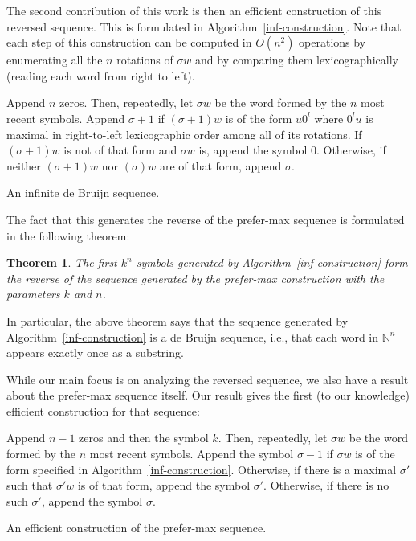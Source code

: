 \documentclass{article}
\newtheorem{theorem}{Theorem}
\theoremstyle{definition}
\newcommand{\N}{{\mathbb{N}}}
\begin{document}
The second contribution of this work is then an efficient construction of this reversed sequence. This is formulated in Algorithm~\ref{inf-construction}. Note that each step of this construction can be computed in $O(n^2)$ operations by enumerating all the $n$ rotations of $\sigma w$ and by comparing them lexicographically (reading each word from right to left).


\begin{algorithm}[!h]
	Append $n$ zeros. Then, repeatedly, let $\sigma w$ be the word formed by the $n$ most recent symbols. Append $\sigma+1$ if $(\sigma+1)w$ is of the form $u0^l$ where $0^lu$ is maximal in right-to-left lexicographic order among all of its rotations. If $(\sigma+1)w$ is not of that form and $\sigma w$ is, append the symbol $0$. Otherwise, if neither $(\sigma+1)w$ nor $(\sigma)w$ are of that form, append $\sigma$.
	\caption{An infinite de Bruijn sequence.}
	\label{inf-construction}
\end{algorithm}

The fact that this generates the reverse of the prefer-max sequence is formulated in the following theorem:
 
\begin{theorem} 
The first $k^n$ symbols generated by Algorithm~\ref{inf-construction} form the reverse of the sequence generated by the prefer-max construction with the parameters $k$ and $n$.	
\end{theorem} 

In particular, the above theorem says that the sequence generated by Algorithm~\ref{inf-construction} is a de Bruijn sequence, i.e., that each word in $\N^n$ appears exactly once as a substring.

While our main focus is on analyzing the reversed sequence, we also have a result about the prefer-max sequence itself. Our result gives the first (to our knowledge) efficient construction for that sequence:

\begin{algorithm}[!h]
	Append $n-1$ zeros and then the symbol $k$. Then, repeatedly, let $\sigma w$ be the word formed by the $n$ most recent symbols. Append the symbol $\sigma-1$  if $\sigma w$  is of the form specified in Algorithm~\ref{inf-construction}. Otherwise, if there is a maximal $\sigma'$ such that $\sigma'w$ is of that form, append the symbol $\sigma'$. Otherwise, if there is no such $\sigma'$, append the symbol $\sigma$.
		
	\caption{An efficient construction of the prefer-max sequence.}
	\label{efficient-pref-max}
\end{algorithm}
\end{document}
